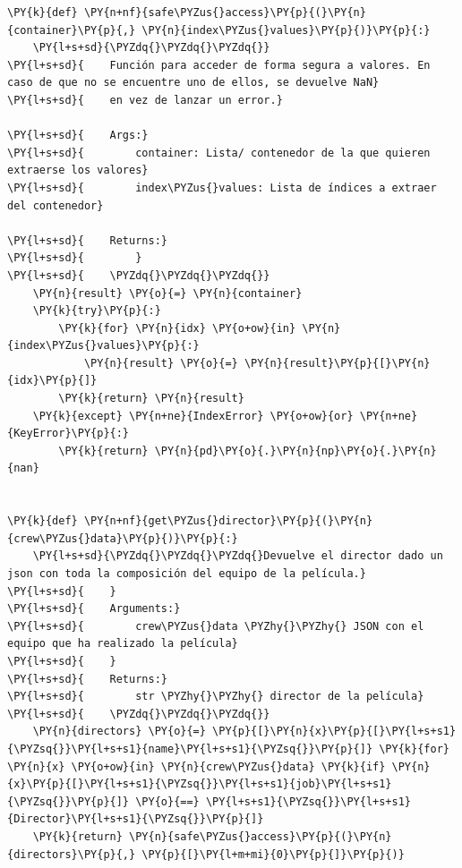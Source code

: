     \begin{tcolorbox}[breakable, size=fbox, boxrule=1pt, pad at break*=1mm,colback=cellbackground, colframe=cellborder]
\begin{Verbatim}[commandchars=\\\{\}]
\PY{k}{def} \PY{n+nf}{safe\PYZus{}access}\PY{p}{(}\PY{n}{container}\PY{p}{,} \PY{n}{index\PYZus{}values}\PY{p}{)}\PY{p}{:}
    \PY{l+s+sd}{\PYZdq{}\PYZdq{}\PYZdq{}}
\PY{l+s+sd}{    Función para acceder de forma segura a valores. En caso de que no se encuentre uno de ellos, se devuelve NaN}
\PY{l+s+sd}{    en vez de lanzar un error.}

\PY{l+s+sd}{    Args:}
\PY{l+s+sd}{        container: Lista/ contenedor de la que quieren extraerse los valores}
\PY{l+s+sd}{        index\PYZus{}values: Lista de índices a extraer del contenedor}

\PY{l+s+sd}{    Returns:}
\PY{l+s+sd}{        }
\PY{l+s+sd}{    \PYZdq{}\PYZdq{}\PYZdq{}}
    \PY{n}{result} \PY{o}{=} \PY{n}{container}
    \PY{k}{try}\PY{p}{:}
        \PY{k}{for} \PY{n}{idx} \PY{o+ow}{in} \PY{n}{index\PYZus{}values}\PY{p}{:}
            \PY{n}{result} \PY{o}{=} \PY{n}{result}\PY{p}{[}\PY{n}{idx}\PY{p}{]}
        \PY{k}{return} \PY{n}{result}
    \PY{k}{except} \PY{n+ne}{IndexError} \PY{o+ow}{or} \PY{n+ne}{KeyError}\PY{p}{:}
        \PY{k}{return} \PY{n}{pd}\PY{o}{.}\PY{n}{np}\PY{o}{.}\PY{n}{nan}


\PY{k}{def} \PY{n+nf}{get\PYZus{}director}\PY{p}{(}\PY{n}{crew\PYZus{}data}\PY{p}{)}\PY{p}{:}
    \PY{l+s+sd}{\PYZdq{}\PYZdq{}\PYZdq{}Devuelve el director dado un json con toda la composición del equipo de la película.}
\PY{l+s+sd}{    }
\PY{l+s+sd}{    Arguments:}
\PY{l+s+sd}{        crew\PYZus{}data \PYZhy{}\PYZhy{} JSON con el equipo que ha realizado la película}
\PY{l+s+sd}{    }
\PY{l+s+sd}{    Returns:}
\PY{l+s+sd}{        str \PYZhy{}\PYZhy{} director de la película}
\PY{l+s+sd}{    \PYZdq{}\PYZdq{}\PYZdq{}}
    \PY{n}{directors} \PY{o}{=} \PY{p}{[}\PY{n}{x}\PY{p}{[}\PY{l+s+s1}{\PYZsq{}}\PY{l+s+s1}{name}\PY{l+s+s1}{\PYZsq{}}\PY{p}{]} \PY{k}{for} \PY{n}{x} \PY{o+ow}{in} \PY{n}{crew\PYZus{}data} \PY{k}{if} \PY{n}{x}\PY{p}{[}\PY{l+s+s1}{\PYZsq{}}\PY{l+s+s1}{job}\PY{l+s+s1}{\PYZsq{}}\PY{p}{]} \PY{o}{==} \PY{l+s+s1}{\PYZsq{}}\PY{l+s+s1}{Director}\PY{l+s+s1}{\PYZsq{}}\PY{p}{]}
    \PY{k}{return} \PY{n}{safe\PYZus{}access}\PY{p}{(}\PY{n}{directors}\PY{p}{,} \PY{p}{[}\PY{l+m+mi}{0}\PY{p}{]}\PY{p}{)}



\end{Verbatim}
\end{tcolorbox}
